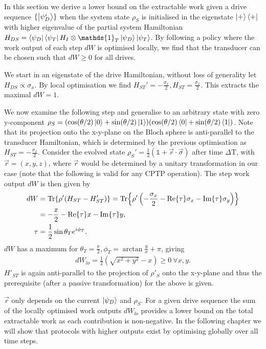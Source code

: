 In this section we derive a lower bound on the extractable work given a drive sequence $\{\ket{\psi_D^i}\}$ when the system state $\rho_S$ is initialised in the eigenstate $\ket{+}\bra{+}$ with higher eigenvalue of the partial system Hamiltonian $H_{DS} = \bra{\psi_D}\bra{\psi_T} H_I \otimes \mathds{1}_T \ket{\psi_D} \ket{\psi_T}$.
By following a policy where the work output of each step $dW$ is optimised locally, we find that the transducer can be chosen such that $dW \geq 0$ for all drives.

We start in an eigenstate of the drive Hamiltonian, without loss of generality let $H_{DS} \propto \sigma_x$.
By local optimisation we find $H_{ST}' = -\frac{\sigma_x}{2}, H_{ST} = \frac{\sigma_x}{2}$.
This extracts the maximal $dW = 1$.

We now examine the following step and generalise to an arbitrary state with zero y-component $\rho_S = (\cos(\theta/2) \ket{0} + \sin(\theta/2) \ket{1})(\cos(\theta/2) \bra{0} + \sin(\theta/2) \bra{1})$.
Note that its projection onto the x-y-plane on the Bloch sphere is anti-parallel to the transducer Hamiltonian, which is determined by the previous optimisation as $H_{ST} = -\frac{\sigma_x}{2}$.
Consider the evolved state $\rho_S' =\frac{1}{2} (\mathds{1} + \vec{r} \cdot \vec{\sigma})$ after time $\Delta \mathrm{T}$, with $\vec{r} = ( x, y, z )$, where $\vec{r}$ would be determined by a unitary transformation in our case (note that the following is valid for any CPTP operation). The step work output $dW$ is then given by
\begin{align*}
dW &= \Tr{\rho' (H_{ST} - H'_{ST})} = \Tr{\rho' \left(-\frac{\sigma_x}{2} - \Re{\tau} \sigma_x - \Im{\tau} \sigma_y \right)} \\
&= -\frac{x}{2} - \Re{\tau} x - \Im{\tau} y, \\
\tau &= \frac{1}{2} \sin{\theta_T} e^{i\phi_T}. 
\end{align*}
$dW$ has a maximum for $\theta_T = \frac{\pi}{2}, \phi_T = \arctan{\frac{y}{x}} + \pi$, giving
\begin{align*}
dW_{lo} = \frac{1}{2}\left(\sqrt{x^2 + y^2} -x\right) \geq 0 \ \forall x, y.
\end{align*}
$H'_{ST}$ is again anti-parallel to the projection of $\rho'_S$ onto the x-y-plane and thus the prerequisite (after a passive transformation) for the above is given.

$\vec{r}$ only depends on the current $\ket{\psi_D}$ and $\rho_S$.
For a given drive sequence the sum of the locally optimised work outputs $dW_{lo}$ provides a lower bound on the total extractable work as each contribution is non-negative. In the following chapter we will show that protocols with higher outputs exist by optimising globally over all time steps.
